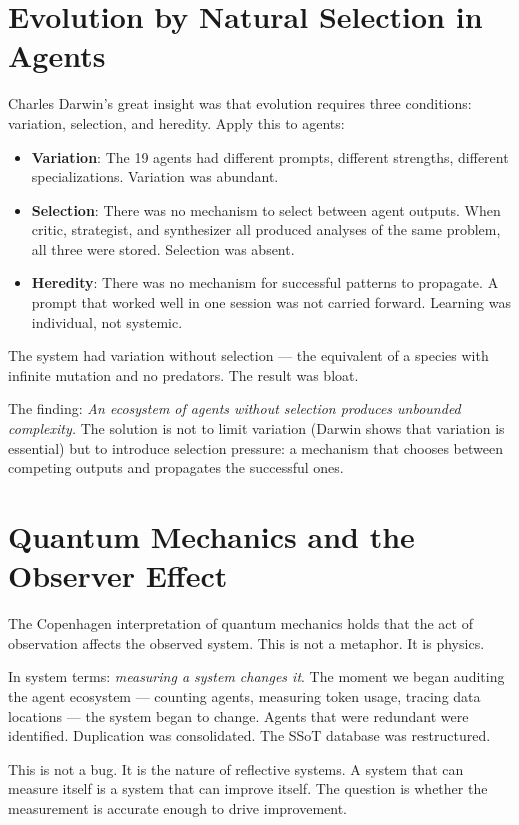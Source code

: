 \documentclass[12pt,a4paper,oneside]{book}
\begin{document}
\section{Evolution by Natural Selection in Agents}

Charles Darwin's great insight was that evolution requires three conditions: variation, selection, and heredity. Apply this to agents:

\begin{itemize}
  \item \textbf{Variation}: The 19 agents had different prompts, different strengths, different specializations. Variation was abundant.
  \item \textbf{Selection}: There was no mechanism to select between agent outputs. When critic, strategist, and synthesizer all produced analyses of the same problem, all three were stored. Selection was absent.
  \item \textbf{Heredity}: There was no mechanism for successful patterns to propagate. A prompt that worked well in one session was not carried forward. Learning was individual, not systemic.
\end{itemize}

The system had variation without selection --- the equivalent of a species with infinite mutation and no predators. The result was bloat.

The finding: \emph{An ecosystem of agents without selection produces unbounded complexity.} The solution is not to limit variation (Darwin shows that variation is essential) but to introduce selection pressure: a mechanism that chooses between competing outputs and propagates the successful ones.

\section{Quantum Mechanics and the Observer Effect}

The Copenhagen interpretation of quantum mechanics holds that the act of observation affects the observed system. This is not a metaphor. It is physics.

In system terms: \emph{measuring a system changes it}. The moment we began auditing the agent ecosystem --- counting agents, measuring token usage, tracing data locations --- the system began to change. Agents that were redundant were identified. Duplication was consolidated. The SSoT database was restructured.

This is not a bug. It is the nature of reflective systems. A system that can measure itself is a system that can improve itself. The question is whether the measurement is accurate enough to drive improvement.
\end{document}
